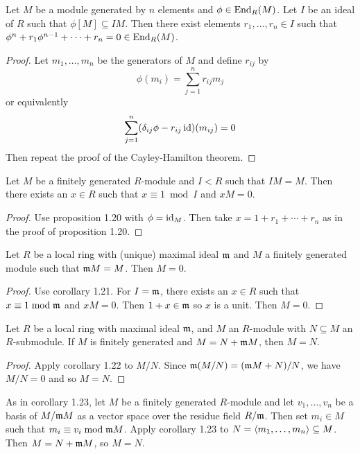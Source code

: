 \begin{prop}[1.20]
	Let $M$ be a module generated by $n$ elements and $\phi \in \operatorname{End}_R(M)$.
	Let $I$ be an ideal of $R$ such that $\phi[M] \subseteq IM$.
	Then there exist elements $r_1,\ldots,r_n \in I$ such that $\phi^n+r_1\phi^{n-1}+\cdots+r_n=0 \in \operatorname{End}_R(M)$.
\end{prop}

\begin{proof}
	Let $m_1,\ldots,m_n$ be the generators of $M$ and define $r_{ij}$ by
	\[\phi(m_i)=\sum_{j=1}^n r_{ij}m_j\]
	or equivalently
	\[\sum_{j=1}^n (\delta_{ij}\phi-r_{ij}\operatorname{id})(m_{ij})=0\]
	Then repeat the proof of the Cayley-Hamilton theorem.
\end{proof}	

\begin{cor}[1.21]
	Let $M$ be a finitely generated $R$-module and $I<R$ such that $IM=M$.
	Then there exists an $x \in R$ such that $x \equiv 1 \bmod I$ and $xM=0$.
\end{cor}

\begin{proof}
	Use proposition 1.20 with $\phi=\operatorname{id}_M$.
	Then take $x=1+r_1+\cdots+r_n$ as in the proof of proposition 1.20.
\end{proof}

\begin{cor}
	Let $R$ be a local ring with (unique) maximal ideal $\mathfrak{m}$ and $M$ a finitely generated module such that $\mathfrak{m} M=M$.
	Then $M=0$.
\end{cor}

\begin{proof}
	Use corollary 1.21.
	For $I=\mathfrak{m}$, there exists an $x \in R$ such that $x \equiv 1 \bmod \mathfrak{m}$ and $xM=0$.
	Then $1+x \in \mathfrak{m}$ so $x$ is a unit.
	Then $M=0$.
\end{proof}

\begin{cor}[1.23]
	Let $R$ be a local ring with maximal ideal $\mathfrak{m}$, and $M$ an $R$-module with $N \subseteq M$ an $R$-submodule.
	If $M$ is finitely generated and $M=N+\mathfrak{m} M$, then $M=N$.
\end{cor}

\begin{proof}
	Apply corollary 1.22 to $M/N$.
	Since $\mathfrak{m}(M/N)=(\mathfrak{m} M+N)/N$, we have $M/N=0$ and so $M=N$.
\end{proof}

\begin{rmk}
	As in corollary 1.23, let $M$ be a finitely generated $R$-module and let $v_1,\ldots,v_n$ be a basis of $M/\mathfrak{m} M$ as a vector space over the residue field $R/\mathfrak{m}$.
	Then set $m_i \in M$ such that $m_i \equiv v_i \bmod \mathfrak{m} M$.
	Apply corollary 1.23 to $N={\left\langle m_1,\ldots,m_n \right\rangle} \subseteq M$.
	Then $M=N+\mathfrak{m} M$, so $M=N$.
\end{rmk}

